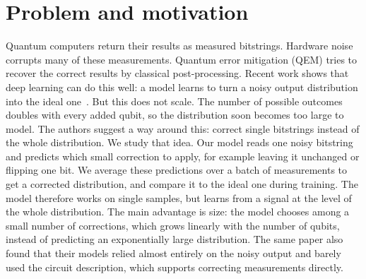\documentclass[english]{ucuproposal}
\begin{document}
\maketitlepage

\section{Problem and motivation}
Quantum computers return their results as measured bitstrings. Hardware noise corrupts
many of these measurements. Quantum error mitigation (QEM) tries to recover the correct
results by classical post-processing. Recent work shows that deep learning can do this
well: a model learns to turn a noisy output distribution into the ideal
one~\cite{placidi2026qem}. But this does not scale. The number of possible outcomes
doubles with every added qubit, so the distribution soon becomes too large to model. The
authors suggest a way around this: correct single bitstrings instead of the whole
distribution. We study that idea. Our model reads one noisy bitstring and predicts which
small correction to apply, for example leaving it unchanged or flipping one bit. We
average these predictions over a batch of measurements to get a corrected distribution,
and compare it to the ideal one during training. The model therefore works on single
samples, but learns from a signal at the level of the whole distribution. The main
advantage is size: the model chooses among a small number of corrections, which grows
linearly with the number of qubits, instead of predicting an exponentially large
distribution. The same paper also found that their models relied almost entirely on the
noisy output and barely used the circuit description, which supports correcting
measurements directly.
\end{document}
